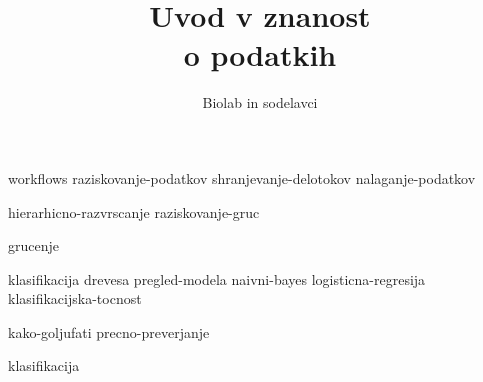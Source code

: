 \documentclass[symmetric, justified, a4paper]{tufte-book}
\title{Uvod v znanost \\o podatkih}
\author[Biolab in sodelavci]{Biolab in sodelavci}
\begin{document}
\frontmatter

\maketitle



\tableofcontents

% 

\mainmatter


{workflows}
{raziskovanje-podatkov}
{shranjevanje-delotokov}
{nalaganje-podatkov}


{hierarhicno-razvrscanje}
{raziskovanje-gruc}

{grucenje}


{klasifikacija}
{drevesa}
{pregled-modela}
{naivni-bayes}
{logisticna-regresija}
{klasifikacijska-tocnost}


{kako-goljufati}
{precno-preverjanje}

{klasifikacija}

\backmatter

\nocite{*}


\end{document}
